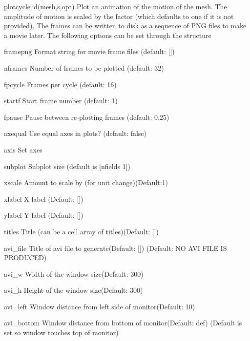 \begin{codelist}

  \item[plotcycle1d(mesh,s,opt)]
    Plot an animation of the motion of the mesh.  The amplitude of
    motion is scaled by the factor  (which defaults to one
    if it is not provided).  The frames can be written to disk as a
    sequence of PNG files to make a movie later.
    The following options can be set through the  structure
    \begin{codelist}[framepng]
      \item[framepng] Format string for movie frame files (default: [])
      \item[nframes]  Number of frames to be plotted (default: 32)
      \item[fpcycle]  Frames per cycle (default: 16)
      \item[startf]   Start frame number (default: 1)
      \item[fpause]   Pause between re-plotting frames (default: 0.25)
      \item[axequal]  Use equal axes in plots? (default: false)
      \item[axis]     Set axes
      \item[subplot]  Subplot size (default is [nfields 1])
      \item[xscale]   Amount to scale by (for unit change)(Default:1)
      \item[xlabel]   X label (Default: [])
      \item[ylabel]   Y label (Default: []) 
      \item[titles]   Title (can be a cell array of titles)(Default: []) 
      \item[avi\_file]Title of avi file to generate(Default: []) 
                         (Default: NO AVI FILE IS PRODUCED)
      \item[avi\_w]    Width  of the window size(Default: 300) 
      \item[avi\_h]    Height of the window size(Default: 300) 
      \item[avi\_left] Window distance from left side of monitor(Default: 10) 
      \item[avi\_bottom]Window distance from bottom    of monitor(Default: def) 
                        (Default is set so window touches top of monitor)
    \end{codelist}



\end{codelist}
